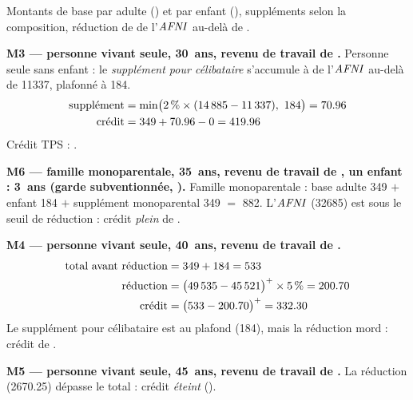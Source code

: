 \pexemples Montants de base par adulte () et par enfant
(), suppléments selon la composition, réduction de
 de l'$\mathit{AFNI}$ au-delà de .

\medskip\noindent\textbf{M3 --- personne vivant seule, 30~ans, revenu de travail de .}
Personne seule sans enfant : le \emph{supplément pour célibataire}
s'accumule à  de l'$\mathit{AFNI}$ au-delà de \num{11337},
plafonné à \num{184}.
\begin{align*}
\text{supplément} &= \min\bigl(\num{2}\,\% \times (\num{14885} - \num{11337}),\ \num{184}\bigr) = \num{70.96} \\
\text{crédit} &= \num{349} + \num{70.96} - 0 = \num{419.96}
\end{align*}
Crédit TPS : .

\medskip\noindent\textbf{M6 --- famille monoparentale, 35~ans, revenu de travail de , un enfant : 3~ans (garde subventionnée, ).}
Famille monoparentale : base adulte \num{349} $+$ enfant
\num{184} $+$ supplément monoparental \num{349} $=$
\num{882}. L'$\mathit{AFNI}$ (\num{32685}) est sous le seuil de
réduction : crédit \emph{plein} de .

\medskip\noindent\textbf{M4 --- personne vivant seule, 40~ans, revenu de travail de .}
\begin{align*}
\text{total avant réduction} &= \num{349} + \num{184} = \num{533} \\
\text{réduction} &= \bigl(\num{49535} - \num{45521}\bigr)^{+} \times \num{5}\,\% = \num{200.70} \\
\text{crédit} &= \bigl(\num{533} - \num{200.70}\bigr)^{+} = \num{332.30}
\end{align*}
Le supplément pour célibataire est au plafond (\num{184}), mais la
réduction mord : crédit de .

\medskip\noindent\textbf{M5 --- personne vivant seule, 45~ans, revenu de travail de .}
La réduction (\num{2670.25}) dépasse le total : crédit
\emph{éteint} ().
